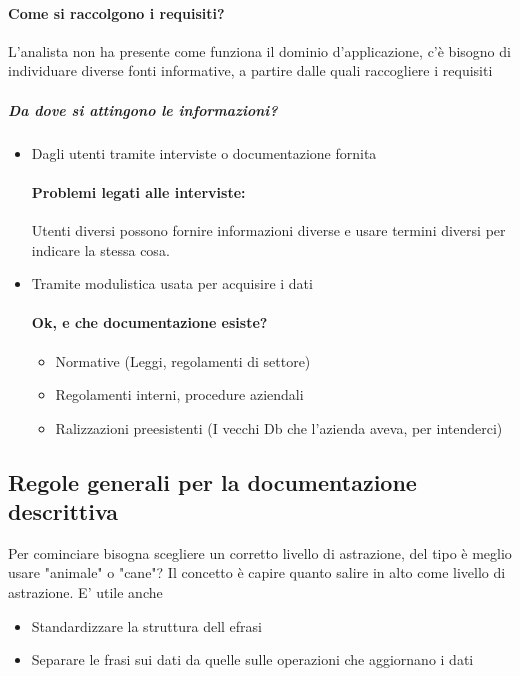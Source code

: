 \documentclass[12pt, a4paper, openany, twoside]{book}
\begin{document}
\paragraph{Come si raccolgono i requisiti?} L'analista non ha presente come funziona
il dominio d'applicazione, c'è bisogno di individuare diverse fonti informative,
a partire dalle quali raccogliere i requisiti
\subparagraph{Da dove si attingono le informazioni?} 
\begin{itemize}
		\item Dagli utenti tramite interviste o documentazione fornita
		\paragraph{Problemi legati alle interviste:} Utenti diversi possono 
		fornire informazioni diverse e usare termini diversi per indicare la stessa cosa.
		\item Tramite modulistica usata per acquisire i dati
		\paragraph{Ok, e che documentazione esiste?} 
		\begin{itemize}
			\item Normative (Leggi, regolamenti di settore)
			\item Regolamenti interni, procedure aziendali
			\item Ralizzazioni preesistenti (I vecchi Db che l'azienda aveva, 
			per intenderci)
		\end{itemize}
\end{itemize}
\subsection{Regole generali per la documentazione descrittiva}
Per cominciare bisogna scegliere un corretto livello di astrazione, del tipo
è meglio usare "animale" o "cane"? Il concetto è capire quanto salire in alto come
livello di astrazione.
E' utile anche
\begin{itemize}
	\item Standardizzare la struttura dell efrasi
	\item Separare le frasi sui dati da quelle sulle operazioni che aggiornano i 
	dati
\end{itemize}
\end{document}
